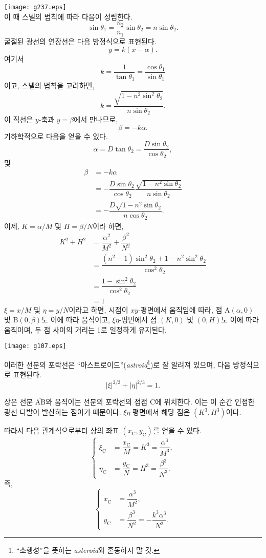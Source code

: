 \documentclass[twocolumn]{article}
\begin{document}
	\texttt{[image: g237.eps]}\\
	이 때 스넬의 법칙에 따라 다음이 성립한다.
	$$ \sin\theta_1 = \frac{n_2}{n_1} \sin\theta_2 = n\sin\theta_2.$$
	굴절된 광선의 연장선은 다음 방정식으로 표현된다.
	$$y=k(x-\alpha).$$
	여기서 
	$$k=\dfrac{1}{\tan\theta_1}=\dfrac{\cos\theta_1}{\sin\theta_1}$$
	이고, 스넬의 법칙을 고려하면,
	$$k=\dfrac{\sqrt{1-n^2\sin^2\theta_2}}{n\sin\theta_2}.$$
	이 직선은 $y$-축과 $y=\beta$에서 만나므로,
	$$\beta = -k\alpha.$$
	기하학적으로 다음을 얻을 수 있다.
	$$\alpha = D\tan\theta_2 = \dfrac{D\sin\theta_2}{\cos\theta_2},$$
	및
	$$\begin{aligned}
		\beta &= -k\alpha \\
		&= -\dfrac{D\sin\theta_2}{\cos\theta_2}
		\dfrac{\sqrt{1-n^2\sin\theta_2}}{n\sin\theta_2}\\
		&=-\dfrac{D\sqrt{1-n^2\sin\theta_2}}{n\cos\theta_2}.
	\end{aligned}$$
	이제, $K=\alpha/M$ 및 $H=\beta/N$이라 하면,
	$$ \begin{aligned}
		K^2 + H^2 &= \dfrac{\alpha^2}{M^2}+\dfrac{\beta^2}{N^2}\\
		&=\dfrac{\left(n^2-1\right)\sin^2\theta_2 + 1-n^2\sin^2\theta_2}
		{\cos^2\theta_2}\\
		&=\dfrac{1-\sin^2\theta_2}{\cos^2\theta_2}\\
		&=1
	\end{aligned}$$
	$\xi=x/M$ 및 $\eta=y/N$이라고 하면, 시점이 $xy$-평면에서 움직임에 따라,
	점 $\mathrm{A}(\alpha, 0)$ 및 $\mathrm{B}(0, \beta)$도 이에 따라 움직이고, 
	$\xi\eta$-평면에서 점 $(K, 0)$ 및 $(0, H)$도 이에 따라 움직이며, 
	두 점 사이의 거리는 1로 일정하게 유지된다.
	
	\texttt{[image: g107.eps]}
	
	이러한 선분의 포락선은 ``아스트로이드''(\emph{astroid}\footnote{
		``소행성''을 뜻하는 \emph{asteroid}와 혼동하지 말 것.})로 잘 알려져 있으며, 
	다음 방정식으로 표현된다.
	$$ \left| \xi \right|^{2/3} + \left| \eta \right|^{2/3} = 1. $$
	
	상은 선분 $\overline{\mathrm{AB}}$와 움직이는 선분의 포락선의 접점 $\mathrm{C}$에 위치한다. 
	이는 이 순간 인접한 광선 다발이 발산하는 점이기 때문이다. 
	$\xi\eta$-평면에서 해당 점은 $(K^3, H^3)$이다.
	
	따라서 다음 관계식으로부터 상의 좌표 $(x_{\mathrm{C}}^{}, y_{\mathrm{C}}^{})$를 얻을 수 있다.
	$$ \left\{ 
	\begin{aligned}
		\xi_{\mathrm{C}}^{} &= \dfrac{x_{\mathrm{C}}^{}}{M} = K^3 = \dfrac{\alpha^3}{M^3},\\
		\eta_{\mathrm{C}}^{} &= \dfrac{y_{\mathrm{C}}^{}}{N} = H^3 = \dfrac{\beta^3}{N^3}.
	\end{aligned}
	\right.$$
	즉,
	$$ \left\{ 
	\begin{aligned}
		x_{\mathrm{C}}^{} &= \dfrac{\alpha^3}{M^2},\\
		y_{\mathrm{C}}^{} &= \dfrac{\beta^3}{N^2}=-\dfrac{k^3\alpha^3}{N^2}.
	\end{aligned}
	\right.$$
	
\end{document}
